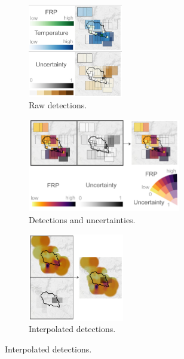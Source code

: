 \begin{figure}[h]
    \begin{subfigure}[t]{0.26\textwidth}
        \centering
        \includegraphics[height=1.6in]{images/remote_sensing/satellite_fusion_diagram_1.jpg}
        \caption{Raw detections.}
        \label{demo_1}
    \end{subfigure}\hfill%
    \begin{subfigure}[t]{0.44\textwidth}
        \centering
        \includegraphics[height=1.6in]{images/remote_sensing/satellite_fusion_diagram_2.jpg}
        \caption{Detections and uncertainties.}
        \label{demo_2}
    \end{subfigure}\hfill%
    \begin{subfigure}[t]{0.26\textwidth}
        \centering
        \includegraphics[height=1.5in]{images/remote_sensing/satellite_fusion_diagram_3.jpg}
        \caption{Interpolated detections.}
        \label{demo_3}
    \end{subfigure}

\end{figure}
